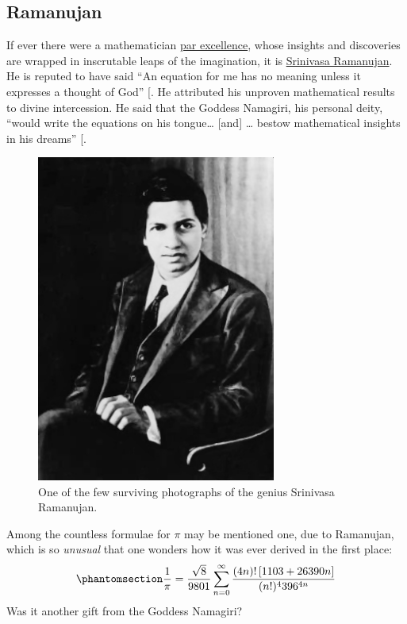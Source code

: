\documentclass[
  a4paper,
]{article}
\begin{document}
\subsection{Ramanujan}\label{ramanujan}

If ever there were a mathematician
\href{https://www.thefreedictionary.com/par+excellence}{par excellence},
whose insights and discoveries are wrapped in inscrutable leaps of the
imagination, it is
\href{https://en.wikipedia.org/wiki/Srinivasa_Ramanujan}{Srinivasa
Ramanujan}. He is reputed to have said ``An equation for me has no
meaning unless it expresses a thought of God''
{[}\citeproc{ref-kanigel-1992}{41}{]}. He attributed his unproven
mathematical results to divine intercession. He said that the Goddess
Namagiri, his personal deity, ``would write the equations on his
tongue\ldots{} {[}and{]} \ldots{} bestow mathematical insights in his
dreams'' {[}\citeproc{ref-kanigel-1992}{41}{]}.

\begin{figure}
\centering
\includegraphics[width=0.7\textwidth,height=\textheight]{images/Srinivasa_Ramanujan_Cleanup.jpg}
\caption{One of the few surviving photographs of the genius Srinivasa
Ramanujan.}\label{fig:ramanujan}
\end{figure}

Among the countless formulae for \(\pi\) may be mentioned one, due to
Ramanujan, which is so \emph{unusual} that one wonders how it was ever
derived in the first place:
\begin{equation}\phantomsection\label{eq:ramanujan-pi}{
\frac{1}{\pi} = \frac{\sqrt 8}{9801}\sum_{n = 0}^{\infty}%
\frac{(4n)!\left[ 1103 + 26390n \right]}{(n!)^4 396^{4n}}
}\end{equation} Was it another gift from the Goddess Namagiri?
\end{document}
